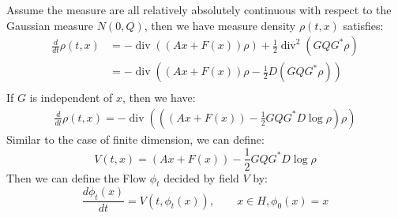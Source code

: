 Assume the measure are all relatively absolutely continuous with respect to the Gaussian measure $N(0, Q)$, then we have measure density $\rho(t, x)$ satisfies:
\begin{equation}
    \begin{aligned}
        \frac{d}{dt} \rho(t, x) &= -\operatorname{div}\left((Ax + F(x))\rho\right) + \frac{1}{2}\operatorname{div}^2\left(GQG^*\rho\right)\\
        &= -\operatorname{div}\left(\left(Ax + F(x)\right)\rho - \frac{1}{2}D\left(GQG^*\rho\right)\right)\\
    \end{aligned}
\end{equation}
If $G$ is independent of $x$, then we have:
\begin{equation}
    \begin{aligned}
        \frac{d}{dt} \rho(t, x) = -\operatorname{div}\left(\left((Ax + F(x)) - \frac{1}{2}GQG^*D\log\rho\right)\rho\right)
    \end{aligned}
\end{equation}
Similar to the case of finite dimension, we can define:
\begin{equation}
    V(t, x) = (Ax + F(x)) - \frac{1}{2}GQG^*D\log\rho
\end{equation}
Then we can define the Flow $\phi_t$ decided by field $V$ by:
\begin{equation}
    \frac{d\phi_t(x)}{dt} = V(t, \phi_t(x)), \qquad x\in H, \phi_0(x) = x
\end{equation}

